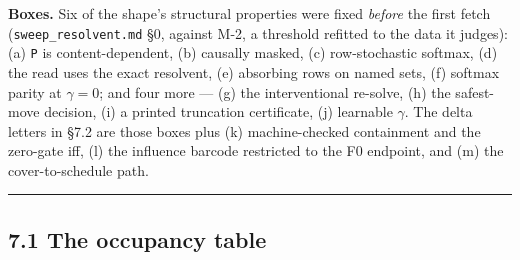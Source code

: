\documentclass[11pt,a4paper]{article}
\theoremstyle{plain}
\theoremstyle{definition}
\theoremstyle{remark}
\begin{document}
\textbf{Boxes.} Six of the shape's structural properties were fixed
\emph{before} the first fetch (\texttt{sweep\_resolvent.md} §0, against
M-2, a threshold refitted to the data it judges): (a) \texttt{P} is
content-dependent, (b) causally masked, (c) row-stochastic softmax, (d)
the read uses the exact resolvent, (e) absorbing rows on named sets, (f)
softmax parity at \(\gamma=0\); and four more --- (g) the interventional
re-solve, (h) the safest-move decision, (i) a printed truncation
certificate, (j) learnable \(\gamma\). The delta letters in §7.2 are
those boxes plus (k) machine-checked containment and the zero-gate iff,
(l) the influence barcode restricted to the F0 endpoint, and (m) the
cover-to-schedule path.

\begin{center}\rule{0.5\linewidth}{0.5pt}\end{center}

\subsection{7.1 The occupancy table}\label{the-occupancy-table}
\end{document}
